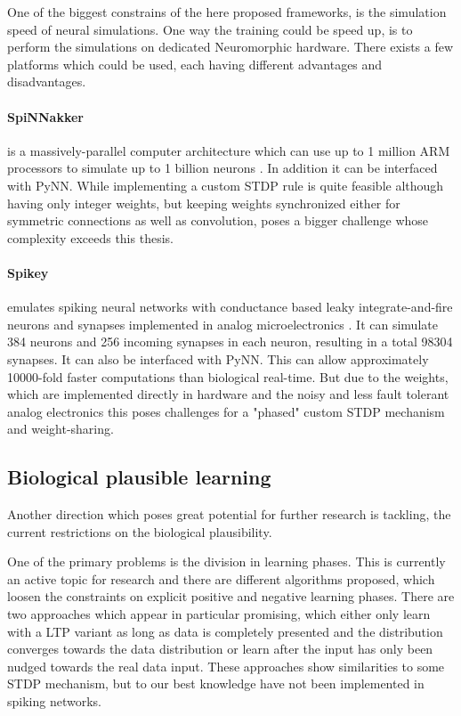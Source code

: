 One of the biggest constrains of the here proposed frameworks, is the simulation speed of neural simulations.
One way the training could be speed up, is to perform the simulations on dedicated Neuromorphic hardware. 
There exists a few platforms which could be used, each having different advantages and disadvantages.

\paragraph{SpiNNakker} \label{c:spinnakker}
is a massively-parallel computer architecture which can use up to 1 million ARM processors to simulate up to 1 billion neurons \cite{jin2008efficient}. 
In addition it can be interfaced with PyNN. 
While implementing a custom STDP rule is quite feasible although having only integer weights, but keeping weights synchronized either for symmetric connections as well as convolution, poses a bigger challenge whose complexity exceeds this thesis.

\paragraph{Spikey} \label{c:spikey}
emulates spiking neural networks with conductance based leaky integrate-and-fire neurons and synapses implemented in analog microelectronics \cite{Pfeil1311}.
It can simulate 384 neurons and 256 incoming synapses in each neuron, resulting in a total 98304 synapses.
It can also be interfaced with PyNN.
This can allow approximately 10000-fold faster computations than biological real-time.
But due to the weights, which are implemented directly in hardware and the noisy and less fault tolerant analog electronics this poses challenges for a "phased" custom STDP mechanism and weight-sharing. 

\subsection{Biological plausible learning} \label{c:biofuture}

Another direction which poses great potential for further research is tackling, the current restrictions on the biological plausibility.  

One of the primary problems is the division in learning phases.
This is currently an active topic for research and there are different algorithms proposed, which loosen the constraints on explicit positive and negative learning phases.
There are two approaches which appear in particular promising, which either only learn with a LTP variant as long as data is completely presented and the distribution converges towards the data distribution or learn after the input has only been nudged towards the real data input\cite{DBLP:journals/corr/ScellierB16}\cite{Scellier2016a}.
These approaches show similarities to some STDP mechanism, but to our best knowledge have not been implemented in spiking networks.

